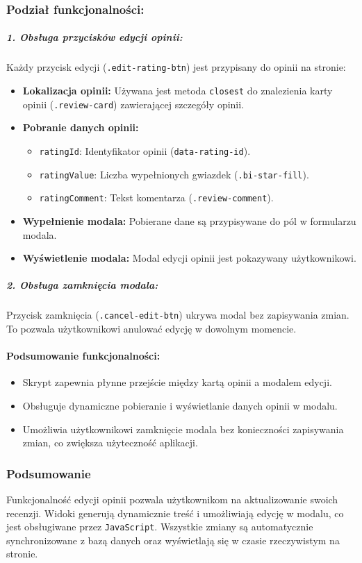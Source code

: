 \documentclass[12pt,a4paper,oneside]{article}
\theoremstyle{definition}
\numberwithin{equation}{section}
\begin{document}
\subsubsection*{Podział funkcjonalności:}
\subparagraph{1. Obsługa przycisków edycji opinii:}
Każdy przycisk edycji (\texttt{.edit-rating-btn}) jest przypisany do opinii na stronie:
\begin{itemize}
    \item \textbf{Lokalizacja opinii:} 
    Używana jest metoda \texttt{closest} do znalezienia karty opinii (\texttt{.review-card}) zawierającej szczegóły opinii.
    \item \textbf{Pobranie danych opinii:}
    \begin{itemize}
        \item \texttt{ratingId}: Identyfikator opinii (\texttt{data-rating-id}).
        \item \texttt{ratingValue}: Liczba wypełnionych gwiazdek (\texttt{.bi-star-fill}).
        \item \texttt{ratingComment}: Tekst komentarza (\texttt{.review-comment}).
    \end{itemize}
    \item \textbf{Wypełnienie modala:} Pobierane dane są przypisywane do pól w formularzu modala.
    \item \textbf{Wyświetlenie modala:} Modal edycji opinii jest pokazywany użytkownikowi.
\end{itemize}

\subparagraph{2. Obsługa zamknięcia modala:}
Przycisk zamknięcia (\texttt{.cancel-edit-btn}) ukrywa modal bez zapisywania zmian. To pozwala użytkownikowi anulować edycję w dowolnym momencie.

\paragraph{Podsumowanie funkcjonalności:}
\begin{itemize}
    \item Skrypt zapewnia płynne przejście między kartą opinii a modalem edycji.
    \item Obsługuje dynamiczne pobieranie i wyświetlanie danych opinii w modalu.
    \item Umożliwia użytkownikowi zamknięcie modala bez konieczności zapisywania zmian, co zwiększa użyteczność aplikacji.
\end{itemize}



\subsubsection{Podsumowanie}
Funkcjonalność edycji opinii pozwala użytkownikom na aktualizowanie swoich recenzji. Widoki generują dynamicznie treść i umożliwiają edycję w modalu, co jest obsługiwane przez \texttt{JavaScript}. Wszystkie zmiany są automatycznie synchronizowane z bazą danych oraz wyświetlają się w czasie rzeczywistym na stronie.
\end{document}
